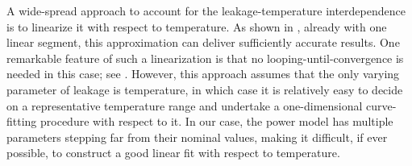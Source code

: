 \begin{remark}
A wide-spread approach to account for the leakage-temperature interdependence is to linearize it with respect to temperature.
As shown in \cite{liu2007}, already with one linear segment, this approximation can deliver sufficiently accurate results.
One remarkable feature of such a linearization is that no looping-until-convergence is needed in this case; see \cite{ukhov2012}.
However, this approach assumes that the only varying parameter of leakage is temperature, in which case it is relatively easy to decide on a representative temperature range and undertake a one-dimensional curve-fitting procedure with respect to it.
In our case, the power model has multiple parameters stepping far from their nominal values, making it difficult, if ever possible, to construct a good linear fit with respect to temperature.
\end{remark}
